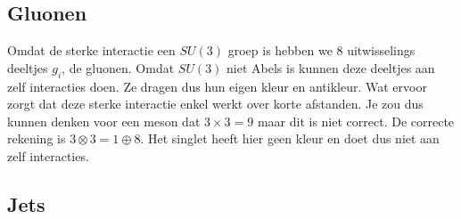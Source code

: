 \documentclass[../main.tex]{subfiles}
\begin{document}
\subsection{Gluonen}%
\label{sub:gluonen}

Omdat de sterke interactie een $SU(3)$ groep is hebben we 8 uitwisselings deeltjes $g_i$, de gluonen. Omdat $SU(3)$ niet Abels is kunnen deze deeltjes aan zelf interacties doen. Ze dragen dus hun eigen kleur en antikleur. Wat ervoor zorgt dat deze sterke interactie enkel werkt over korte afstanden. Je zou dus kunnen denken voor een meson dat $3\times 3 = 9$ maar dit is niet correct. De correcte rekening is $3\otimes 3 = 1 \oplus 8$. Het singlet heeft hier geen kleur en doet dus niet aan zelf interacties.

\subsection{Jets}%
\label{sub:jets}
\end{document}
